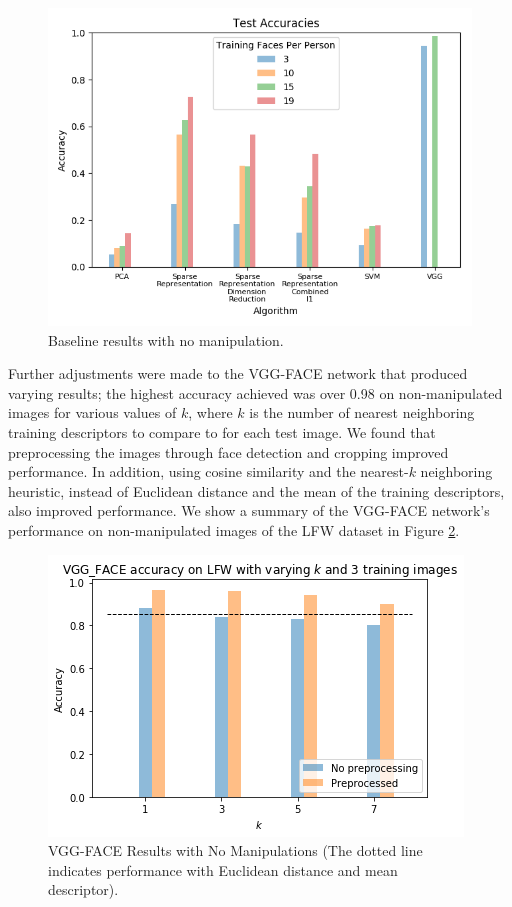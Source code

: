 \documentclass[pageno]{cos429}
\begin{document}
\begin{figure}
\centering
\includegraphics[scale=0.5]{../figures/results_plots/default_accuracies_difftraintest.png}
\caption{Baseline results with no manipulation.}
\label{fig:baseline}
\end{figure}

Further adjustments were made to the VGG-FACE network that produced varying results; the highest accuracy achieved was over 0.98 on non-manipulated images for various values of $k$, where $k$ is the number of nearest neighboring training descriptors to compare to for each test image. We found that preprocessing the images through face detection and cropping improved performance. In addition, using cosine similarity and the nearest-$k$ neighboring heuristic, instead of Euclidean distance and the mean of the training descriptors, also improved performance. We show a summary of the VGG-FACE network's performance on non-manipulated images of the LFW dataset in Figure \ref{fig:vgg_nonmanipulated}.

\begin{figure}
\centering
\includegraphics[scale=0.5]{../figures/results_plots/vgg_1.png}
\caption{VGG-FACE Results with No Manipulations (The dotted line indicates performance with Euclidean distance and mean descriptor).}
\label{fig:vgg_nonmanipulated}
\end{figure}
\end{document}
